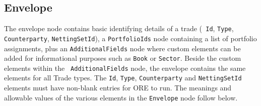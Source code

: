 \subsection{Envelope}\label{ss:envelope}
The envelope node contains basic identifying details of a trade ({\tt
  Id}, {\tt Type}, {\tt Counterparty}, {\tt NettingSetId}), a 
{\tt PortfolioIds} node containing a list of portfolio assignments, 
plus an {\tt AdditionalFields} node where custom
elements can be added for informational purposes such as {\tt Book} or
{\tt Sector}. Beside the custom elements within the {\tt
  AdditionalFields} node, the envelope contains the same elements for
all Trade types.  The {\tt Id}, {\tt Type}, {\tt Counterparty} and
{\tt NettingSetId} elements must have non-blank entries for ORE to
run. 
The meanings and allowable values of the various elements in the \lstinline!Envelope!  node follow below.


